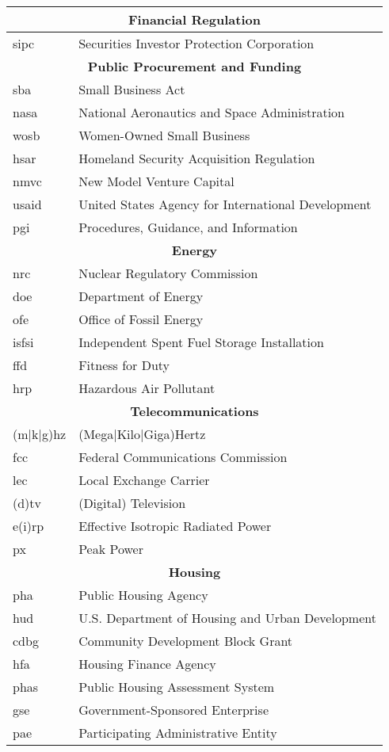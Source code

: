 \footnotesize
\begin{tabular}{ll}
    \toprule
    \multicolumn{2}{c}{\bfseries Financial Regulation}\\
    \midrule
    sipc            &Securities Investor Protection Corporation\\
    \midrule
    \multicolumn{2}{c}{\bfseries Public Procurement and Funding}\\
    \midrule
    sba             &Small Business Act\\
    nasa            &National Aeronautics and Space Administration\\
    wosb            &Women-Owned Small Business\\
    hsar            &Homeland Security Acquisition Regulation\\
    nmvc            &New Model Venture Capital\\
    usaid           &United States Agency for International Development\\
    pgi             &Procedures, Guidance, and Information\\
    \midrule
    \multicolumn{2}{c}{\bfseries Energy}\\
    \midrule
    nrc             &Nuclear Regulatory Commission\\
    doe             &Department of Energy\\
    ofe             &Office of Fossil Energy\\
    isfsi           &Independent Spent Fuel Storage Installation\\
    ffd             &Fitness for Duty\\
    hrp             &Hazardous Air Pollutant\\
    \midrule
    \multicolumn{2}{c}{\bfseries Telecommunications}\\
    \midrule
    (m$|$k$|$g)hz   &(Mega$|$Kilo$|$Giga)Hertz\\
    fcc             &Federal Communications Commission\\
    lec             &Local Exchange Carrier\\
    (d)tv           &(Digital) Television\\
    e(i)rp          &Effective Isotropic Radiated Power\\
    px              &Peak Power\\
    \midrule
    \multicolumn{2}{c}{\bfseries Housing}\\
    \midrule
    pha             &Public Housing Agency\\
    hud             &U.S. Department of Housing and Urban Development\\
    cdbg            &Community Development Block Grant\\
    hfa             &Housing Finance Agency\\
    phas            &Public Housing Assessment System\\
    gse             &Government-Sponsored Enterprise\\
    pae             &Participating Administrative Entity\\
    \bottomrule
\end{tabular}